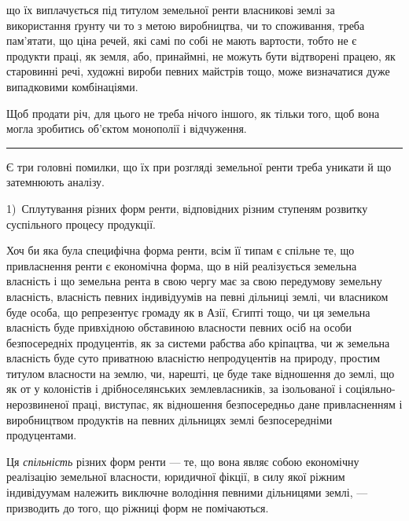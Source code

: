 \parcont{}  %
що їх виплачується під титулом земельної ренти власникові землі за використання
ґрунту чи то з метою виробництва, чи то споживання, треба пам’ятати, що
ціна речей, які самі по собі не мають вартости, тобто не є продукти праці, як
земля, або, принаймні, не можуть бути відтворені працею, як старовинні речі,
художні вироби певних майстрів тощо, може визначатися дуже випадковими
комбінаціями.

Щоб продати річ, для цього не треба нічого іншого, як тільки того, щоб
вона могла зробитись об’єктом монополії і відчуження.

\pfbreak{} %

Є три головні помилки, що їх при розгляді земельної ренти треба уникати
й що затемнюють аналізу.

1)~Сплутування різних форм ренти, відповідних різним ступеням розвитку
суспільного процесу продукції.

Хоч би яка була специфічна форма ренти, всім її типам є спільне те, що привласнення
ренти є економічна форма, що в ній реалізується земельна власність і що
земельна рента в свою чергу має за свою передумову земельну власність, власність
певних індивідуумів на певні дільниці землі, чи власником буде особа, що репрезентує
громаду як в Азії, Єгипті тощо, чи ця земельна власність буде привхідною
обставиною власности певних осіб на особи безпосередніх продуцентів, як за системи
рабства або кріпацтва, чи ж земельна власність буде суто приватною
власністю непродуцентів на природу, простим титулом власности на землю, чи,
нарешті, це буде таке відношення до землі, що як от у колоністів і дрібноселянських
землевласників, за ізольованої і соціяльно-нерозвиненої праці, виступає,
як відношення безпосередньо дане привласненням і виробництвом продуктів
на певних дільницях землі безпосередніми продуцентами.

Ця \emph{спільність} різних форм ренти — те, що вона являє собою економічну
реалізацію земельної власности, юридичної фікції, в силу якої ріжним індивідуумам
належить виключне володіння певними дільницями землі, — призводить до
того, що ріжниці форм не помічаються.

